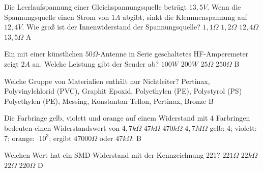 {Die Leerlaufspannung einer Gleichspannungsquelle beträgt $13,5V$. Wenn die Spannungsquelle einen Strom von $1A$ abgibt, sinkt die Klemmenspannung auf $12,4V$. Wie groß ist der Innenwiderstand der Spannungsquelle?}%
{$1,1\Omega$}%
{$1,2\Omega$}%
{$12,4\Omega$}%
{$13,5\Omega$}%
{A}%

{Ein mit einer künstlichen $50\Omega$-Antenne in Serie geschaltetes HF-Amperemeter zeigt $2A$ an. Welche Leistung gibt der Sender ab?}%
{$100W$}%
{$200W$}%
{$25\Omega$}%
{$250\Omega$}%
{B}%

{Welche Gruppe von Materialien enthält nur Nichtleiter?}%
{Pertinax, Polyvinylchlorid (PVC), Graphit}%
{Epoxid, Polyethylen (PE), Polystyrol (PS)}%
{Polyethylen (PE), Messing, Konstantan}%
{Teflon, Pertinax, Bronze}%
{B}%


{Die Farbringe gelb, violett und orange auf einem Widerstand mit 4 Farbringen bedeuten einen Widerstandswert von}%
{$4,7k\Omega$}%
{$47k\Omega$}%
{$470k\Omega$}%
{$4,7M\Omega$}%
{gelb: 4; violett: 7; orange: $\cdot 10^3$; ergibt $47000\Omega$ oder $47k\Omega$: B}%

{Welchen Wert hat ein SMD-Widerstand mit der Kennzeichnung 221?}%
{$221\Omega$}%
{$22k\Omega$}%
{$22\Omega$}%
{$220\Omega$}%
{D}%

